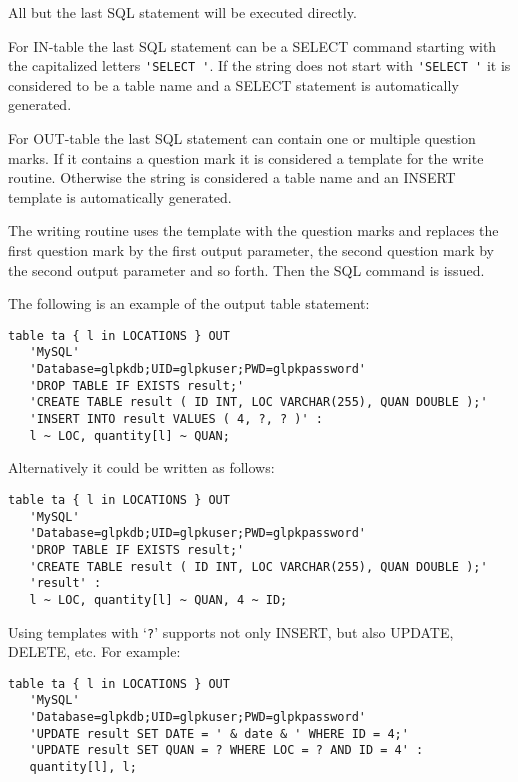 \documentclass[10pt]{article}
\begin{document}
All but the last SQL statement will be executed directly.

For IN-table the last SQL statement can be a SELECT command starting
with the capitalized letters \verb|'SELECT '|. If the string does not
start with \verb|'SELECT '| it is considered to be a table name and a
SELECT statement is automatically generated.

For OUT-table the last SQL statement can contain one or multiple
question marks. If it contains a question mark it is considered a
template for the write routine. Otherwise the string is considered a
table name and an INSERT template is automatically generated.

The writing routine uses the template with the question marks and
replaces the first question mark by the first output parameter, the
second question mark by the second output parameter and so forth. Then
the SQL command is issued.

The following is an example of the output table statement:

\begin{small}
\begin{verbatim}
table ta { l in LOCATIONS } OUT
   'MySQL'
   'Database=glpkdb;UID=glpkuser;PWD=glpkpassword'
   'DROP TABLE IF EXISTS result;'
   'CREATE TABLE result ( ID INT, LOC VARCHAR(255), QUAN DOUBLE );'
   'INSERT INTO result VALUES ( 4, ?, ? )' :
   l ~ LOC, quantity[l] ~ QUAN;
\end{verbatim}
\end{small}

\noindent
Alternatively it could be written as follows:

\begin{small}
\begin{verbatim}
table ta { l in LOCATIONS } OUT
   'MySQL'
   'Database=glpkdb;UID=glpkuser;PWD=glpkpassword'
   'DROP TABLE IF EXISTS result;'
   'CREATE TABLE result ( ID INT, LOC VARCHAR(255), QUAN DOUBLE );'
   'result' :
   l ~ LOC, quantity[l] ~ QUAN, 4 ~ ID;
\end{verbatim}
\end{small}

Using templates with `\verb|?|' supports not only INSERT, but also
UPDATE, DELETE, etc. For example:

\begin{small}
\begin{verbatim}
table ta { l in LOCATIONS } OUT
   'MySQL'
   'Database=glpkdb;UID=glpkuser;PWD=glpkpassword'
   'UPDATE result SET DATE = ' & date & ' WHERE ID = 4;'
   'UPDATE result SET QUAN = ? WHERE LOC = ? AND ID = 4' :
   quantity[l], l;
\end{verbatim}
\end{small}
\end{document}

